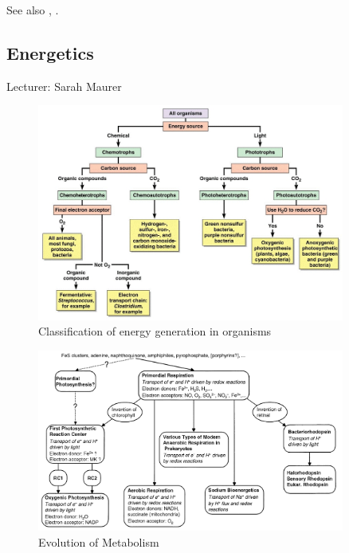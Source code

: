 \documentclass[]{article}
\begin{document}
See also \cite{bar2011survey}, \cite{fuchs2011alternative}.

\subsection{Energetics}

Lecturer: Sarah Maurer


\begin{figure}[H]
	\caption{Classification of energy
		generation in organisms} \label{fig:ClassificationEnergyGeneration} 
	\includegraphics[width=0.9\textwidth]{ClassificationEnergyGeneration}
\end{figure}

\begin{figure}[H]
	\caption{Evolution of Metabolism} \label{fig:EvolutionMetabolism} 
	\includegraphics[width=0.9\textwidth]{EvolutionMetabolism}
\end{figure}
\end{document}
